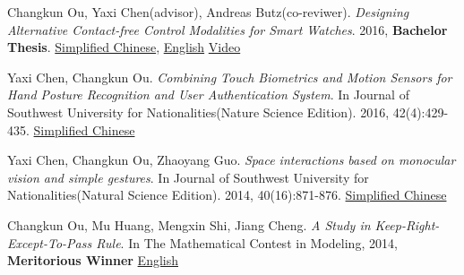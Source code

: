     \item{
        Changkun Ou, Yaxi Chen(advisor), Andreas Butz(co-reviwer).
        \emph{Designing Alternative Contact-free Control Modalities for Smart Watches}. 
        2016, \textbf{Bachelor Thesis}. \href{https://github.com/changkun/papers/blob/master/papers/ou2016bachelor-cn.pdf}{Simplified Chinese}, 
        \href{https://github.com/changkun/papers/blob/master/papers/ou2016bachelor-en.pdf}{English} \href{https://www.youtube.com/watch?v=C2-5z7pIv98}{Video}
    }
    \item{
        Yaxi Chen, Changkun Ou. 
        \emph{Combining Touch Biometrics and Motion Sensors for Hand Posture Recognition and User Authentication System}. 
        In Journal of Southwest University for Nationalities(Nature Science Edition). 
        2016, 42(4):429-435. \href{https://blog.changkun.de/files/cv/touch.swun.html}{Simplified Chinese}
    }
    \item{
        Yaxi Chen, Changkun Ou, Zhaoyang Guo.
        \emph{Space interactions based on monocular vision and simple gestures}. 
        In Journal of Southwest University for Nationalities(Natural Science Edition). 
        2014, 40(16):871-876. \href{https://blog.changkun.de/files/cv/vision.swun.html}{Simplified Chinese}
    }
    \item{
        Changkun Ou, Mu Huang, Mengxin Shi, Jiang Cheng. 
        \emph{A Study in Keep-Right-Except-To-Pass Rule}. 
        In The Mathematical Contest in Modeling, 2014, \textbf{Meritorious Winner} \href{hhttps://github.com/changkun/papers/blob/master/papers/ou2014car-paper.pdf}{English}
    }
 \resumeSubHeadingListEnd